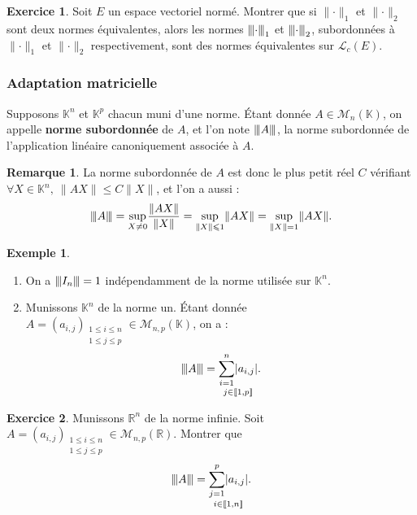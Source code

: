 \documentclass[french]{article}
\newcommand{\R}{\mathbb{R}}
\newcommand{\K}{\mathbb{K}}
\newcommand{\vertiii}[1]{{\left\vert\kern-0.25ex\left\vert\kern-0.25ex\left\vert #1 \right\vert\kern-0.25ex\right\vert\kern-0.25ex\right\vert}}
\theoremstyle{plain}
\theoremstyle{definition}
\newtheorem*{ex}{Exemple}
\newtheorem{exo}{Exercice}
\newtheorem*{rmq}{Remarque}
\theoremstyle{remark}
\begin{document}
\begin{exo}
	Soit $E$ un espace vectoriel normé. Montrer que si $\lVert\cdot\rVert_1$ et $\lVert\cdot\rVert_2$ sont deux normes équivalentes, alors les normes $\vertiii{\cdot}_1$ et $\vertiii{\cdot}_2$, subordonnées à $\lVert\cdot\rVert_1$ et $\lVert\cdot\rVert_2$ respectivement, sont des normes équivalentes sur $\mathcal{L}_c(E)$.
\end{exo}

\subsubsection*{Adaptation matricielle}

\begin{dfn}
	Supposons $\K^n$ et $\K^p$ chacun muni d'une norme. Étant donnée $A\in\mathcal{M}_n(\K)$, on appelle \textbf{norme subordonnée} de $A$, et l'on note $\vertiii{A}$, la norme subordonnée de l'application linéaire canoniquement associée à $A$.
\end{dfn}

\begin{rmq}
	La norme subordonnée de $A$ est donc le plus petit réel $C$ vérifiant $\forall X\in\K^n,\ \lVert AX\rVert\leqslant C\lVert X\rVert$, et l'on a aussi :
	$$\vertiii{A}=\underset{X\ne 0}{\sup}\frac{\lVert AX\rVert}{\lVert X\rVert}=\underset{\lVert X\rVert\leqslant1}{\sup}\lVert AX\rVert=\underset{\lVert X\rVert=1}{\sup}\lVert AX\rVert.$$
\end{rmq}

\begin{ex}
	\begin{enumerate}
		\item On a $\vertiii{I_n}=1$ indépendamment de la norme utilisée sur $\K^n$.
		\item Munissons $\K^n$ de la norme un. Étant donnée $A=(a_{i,j})_{\substack{1\leqslant i\leqslant n\\ 1\leqslant j\leqslant p}}\in\mathcal{M}_{n,p}(\K)$, on a : $$\vertiii{A}=\underset{j\in\llbracket1,p\rrbracket}{\sum_{i=1}^{n}\lvert a_{i,j}\rvert}.$$
	\end{enumerate}
\end{ex}

\begin{exo}
	Munissons $\R^n$ de la norme infinie. Soit $A=(a_{i,j})_{\substack{1\leqslant i\leqslant n\\ 1\leqslant j\leqslant p}}\in\mathcal{M}_{n,p}(\R)$. Montrer que $$\vertiii{A}=\underset{i\in\llbracket1,n\rrbracket}{\sum_{j=1}^{p}\lvert a_{i,j}\rvert}.$$
\end{exo}
\end{document}
